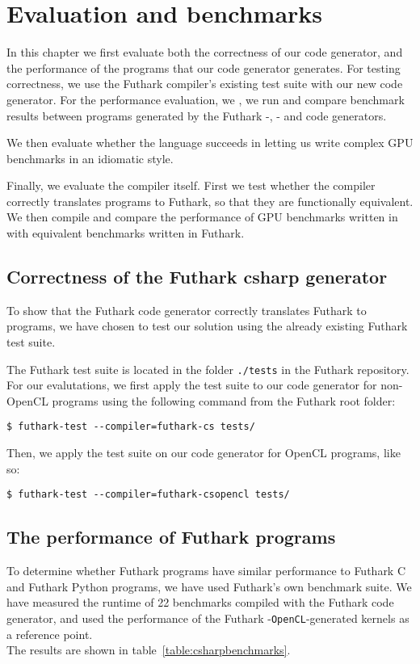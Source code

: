\chapter{Evaluation and benchmarks}
In this chapter we first evaluate both the correctness of our code generator,
and the performance of the \csharp{} programs that our code generator generates.
For testing correctness, we use the Futhark compiler's existing test suite with
our new code generator. For the performance evaluation, we , we run and compare benchmark
results between programs generated by the Futhark \csharp{}-, \clang{}- and \Python{} code generators.

We then evaluate whether the \fshark{} language succeeds in letting us write
complex GPU benchmarks in an idiomatic \fsharp{} style.

Finally, we evaluate the \fshark{} compiler itself. First we test whether the
\fshark{} compiler correctly translates \fshark{} programs to Futhark, so that
they are functionally equivalent.
We then compile and compare the performance of GPU benchmarks written in
\fshark{} with equivalent benchmarks written in Futhark.


\section{Correctness of the Futhark csharp{} generator}
\label{subsec:futharkcsharpcorrectness}
To show that the Futhark \csharp{} code generator correctly translates Futhark
to \csharp{} programs, we have chosen to test our solution using the already existing Futhark test
suite.

The Futhark test suite is located in the folder \texttt{./tests} in the Futhark
repository. For our evalutations, we first apply the test suite to our \csharp{}
code generator for non-OpenCL programs using the following command from the
Futhark root folder:

\begin{verbatim}
$ futhark-test --compiler=futhark-cs tests/
\end{verbatim}

Then, we apply the test suite on our code generator for \csharp{} OpenCL
programs, like so:

\begin{verbatim}
$ futhark-test --compiler=futhark-csopencl tests/
\end{verbatim}



\section{The performance of Futhark \csharp{} programs}
\label{subsec:futharkcsharpperformance}
To determine whether Futhark \csharp{} programs have similar performance to
Futhark C and Futhark Python programs, we have used Futhark's own benchmark
suite.
We have measured the runtime of 22 benchmarks compiled with the Futhark
\csharp{} code generator, and used the performance of the Futhark
\clang{}-\texttt{OpenCL}-generated kernels as a reference point.\\
The results are shown in table~\ref{table:csharpbenchmarks}.

